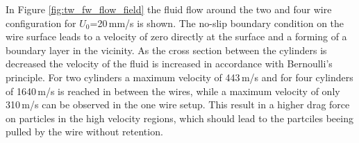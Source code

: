 In Figure \ref{fig:tw_fw_flow_field} the fluid flow around the two and four wire configuration for $U_{0}$=20\,mm/s is shown. The no-slip boundary condition on the wire surface leads to a velocity of zero directly at the surface and a forming of a boundary layer in the vicinity. As the cross section between the cylinders is decreased the velocity of the fluid is increased in accordance with Bernoulli's principle. For two cylinders a maximum velocity of 443\,\textmu m/s and for four cylinders of 1640\,\textmu m/s is reached in between the wires, while a maximum velocity of only 310\,\textmu m/s can be observed in the one wire setup. This result in a higher drag force on particles in the high velocity regions, which should lead to the partciles beeing pulled by the wire without retention.   
  
\begin{figure}
            \begin{subfigure}{0.49\textwidth}
                  \flushleft
          \end{subfigure}\hfill
        \begin{subfigure}{0.49\textwidth}
                \flushright

\end{subfigure}
\end{figure}
